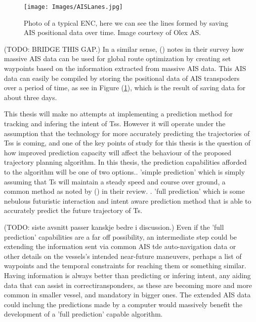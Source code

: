 \begin{figure}[t!]
    \texttt{[image: Images/AISLanes.jpg]}
    \centering
    \caption{Photo of a typical ENC, here we can see the lines formed by saving AIS positional data over time. Image courtesy of Olex AS.}
    \label{FIG: AIS lanes}
\end{figure}


(TODO: BRIDGE THIS GAP.)\newline
In a similar sense, (\cite{zhang2021collision}) notes in their survey how massive AIS data can be used for global route optimization by
creating set waypoints based on the information extracted from massive AIS data.
This AIS data can easily be compiled by storing the positional data of AIS transpoders over a period of time, as see in Figure (\ref{FIG: AIS lanes}), which
is the result of saving data for about three days.


This thesis will make no attempts at implementing a prediction method for tracking and infering the intent of \gls{Ts}s. However it will
operate under the assumption that the technology for more accurately predicting the trajectories of \gls{Ts}s is coming, and one of the key points
of study for this thesis is the question of how improved prediction capacity will affect the behaviour of the proposed trajectory planning algorithm.
In this thesis, the prediction capabilities afforded to the algorithm will be one of two options.. 'simple prediction' which is simply assuming that \gls{Ts} will maintain a steady speed and course over ground, 
a common method as noted by (\cite{huang2020ship}) in their review. . 'full prediction' which is some nebulous futuristic interaction and intent aware prediction method that is able to accurately predict the
future trajectory of \gls{Ts}.

(TODO: siste avsnitt passer kanskje bedre i discussion.)\newline
Even if the 'full prediction' capabilities are a far off possibility, an intermediate step could be extending the information sent via
common AIS tde auto-navigation data or other details on the vessels's intended near-future maneuvers, perhaps a list of waypoints and the temporal
constraints for reaching them or something similar. Having information is always better than predicting or infering intent, any aiding data that can
assist in correctiransponders, as these are becoming more and more common in smaller vessel, and mandatory in bigger ones. The extended AIS data could
inclung the predictions made by a computer would massively benefit the development of a 'full prediction' capable algorithm.



\newpage